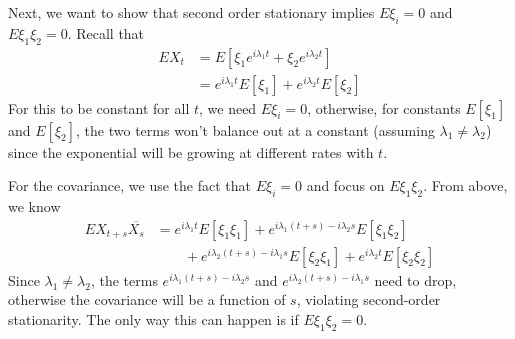 \documentclass[12pt]{article}
\theoremstyle{plain}
\theoremstyle{definition}
\theoremstyle{remark}
\begin{document}
\begin{enumerate}
\begin{enumerate}
        Next, we want to show that second order stationary implies
        $E\xi_i=0$ and $E\xi_1\xi_2=0$.
        Recall that
        \begin{align*}
          EX_t &= E[ \xi_1 e^{i\lambda_1 t} + \xi_2e^{i\lambda_2 t}] \\
          &=  e^{i\lambda_1 t}E[ \xi_1] + e^{i\lambda_2 t}E[\xi_2]
        \end{align*}
        For this to be constant for all $t$, we need $E\xi_i=0$,
        otherwise, for constants $E[\xi_1]$ and $E[\xi_2]$, the two
        terms won't balance out at a constant (assuming $\lambda_1\neq
        \lambda_2$) since the exponential will be growing at different
        rates with $t$.

        For the covariance, we use the fact that $E\xi_i=0$ and focus
        on $E\xi_1\xi_2$. From above, we know
        \begin{align*}
          EX_{t+s}\overline{X_s}
          &= e^{i\lambda_1 t}E[ \xi_1{\xi_1} ]
             + e^{i\lambda_1 (t+s)-i\lambda_2 s}E[ \xi_1{\xi_2} ]\\
          &\qquad
             + e^{i\lambda_2 (t+s)-i\lambda_1 s}E[ \xi_2{\xi_1}]
            + e^{i\lambda_2 t}E[ \xi_2{\xi_2} ]
        \end{align*}
        Since $\lambda_1\neq \lambda_2$, the terms $e^{i\lambda_1
        (t+s)-i\lambda_2 s}$ and $e^{i\lambda_2 (t+s)-i\lambda_1 s}$
        need to drop, otherwise the covariance will be a function of
        $s$, violating second-order stationarity. The only way this can
        happen is if $E\xi_1\xi_2=0$.


\end{enumerate}
\end{enumerate}
\end{document}
